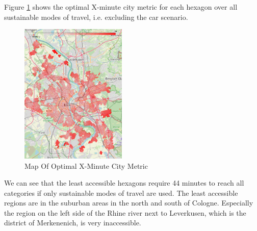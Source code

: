 Figure \ref{fig:optimal_map} shows the optimal X-minute city metric for each hexagon over all sustainable modes of travel, i.e. excluding the car scenario.
\begin{figure}
  \begin{center}
    \includegraphics[width=0.45\textwidth]{Figures/results/minute_city_metric/optimal_map}
  \end{center}
  \caption{Map Of Optimal X-Minute City Metric}
  \label{fig:optimal_map}
\end{figure}
We can see that the least accessible hexagons require 44 minutes to reach all categories if only sustainable modes of travel are used.
The least accessible regions are in the suburban areas in the north and south of Cologne. 
Especially the region on the left side of the Rhine river next to Leverkusen, which is the district of Merkenenich, is very inaccessible.


